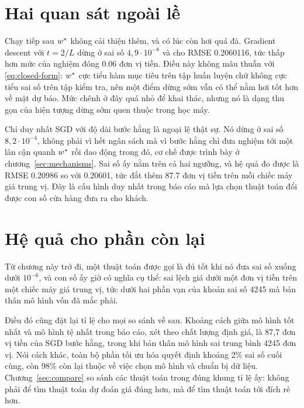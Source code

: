 \section{Hai quan sát ngoài lề}
\label{sec:enough-sgd}

Chạy tiếp sau $w^{*}$ không cải thiện thêm, và có lúc còn hơi quá đà. Gradient
descent với $t = 2/L$ dừng ở sai số $4{,}9 \cdot 10^{-8}$ và cho RMSE
\num{0.2060116}, tức thấp hơn mức của nghiệm đóng \num{0.06} đơn vị tiền. Điều
này không mâu thuẫn với \eqref{eq:closed-form}: $w^{*}$ cực tiểu hàm mục tiêu
trên tập huấn luyện chứ không cực tiểu sai số trên tập kiểm tra, nên một điểm
dừng sớm vẫn có thể nằm hơi tốt hơn về mặt dự báo. Mức chênh ở đây quá nhỏ để
khai thác, nhưng nó là dạng thu gọn của hiện tượng dừng sớm quen thuộc trong học
máy.

Chỉ duy nhất SGD với độ dài bước hằng là ngoại lệ thật sự. Nó dừng ở sai số
$8{,}2 \cdot 10^{-4}$, không phải vì hết ngân sách mà vì bước hằng chỉ đưa nghiệm
tới một lân cận quanh $w^{*}$ rồi dao động trong đó, cơ chế được trình bày ở
chương~\ref{sec:mechanisms}. Sai số ấy nằm trên cả hai ngưỡng, và hệ quả đo được
là RMSE \num{0.20986} so với \num{0.20601}, tức đắt thêm \num{87.7} đơn vị tiền
trên mỗi chiếc máy giá trung vị. Đây là cấu hình duy nhất trong báo cáo mà lựa
chọn thuật toán đổi được con số cửa hàng đưa ra cho khách.

\section{Hệ quả cho phần còn lại}
\label{sec:enough-consequence}

Từ chương này trở đi, một thuật toán được gọi là đủ tốt khi nó đưa sai số xuống
dưới $10^{-6}$, và con số ấy giờ có nghĩa cụ thể: sai lệch giá dưới một đơn vị
tiền trên một chiếc máy giá trung vị, tức dưới hai phần vạn của khoản sai số
\num{4245} mà bản thân mô hình vốn đã mắc phải.

Điều đó cũng đặt lại tỉ lệ cho mọi so sánh về sau. Khoảng cách giữa mô hình tốt
nhất và mô hình tệ nhất trong báo cáo, xét theo chất lượng định giá, là 87,7 đơn
vị tiền của SGD bước hằng, trong khi bản thân mô hình sai trung bình \num{4245}
đơn vị. Nói cách khác, toàn bộ phần tối ưu hóa quyết định khoảng 2\% sai số cuối
cùng, còn 98\% còn lại thuộc về việc chọn mô hình và chuẩn bị dữ liệu.
Chương~\ref{sec:compare} so sánh các thuật toán trong đúng khung tỉ lệ ấy: không
phải để tìm thuật toán dự đoán giá đúng hơn, mà để tìm thuật toán tới đích rẻ
hơn.
